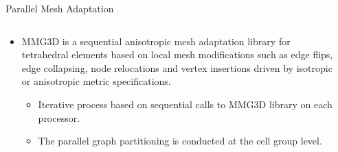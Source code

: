 \documentclass[10pt]{beamer}
\begin{document}
\begin{frame}{Parallel Mesh Adaptation}
\begin{columns}
\begin{column}{0.55\textwidth}
\begin{itemize}
\justifying
\item[\ding{252}] {\color{um6pcolor}MMG3D} is a sequential anisotropic mesh adaptation library for tetrahedral elements
based on local mesh modifications such as edge flips, edge collapsing, node relocations and vertex
insertions driven by isotropic or anisotropic metric specifications.
\begin{itemize}
\justifying
\item[\ding{212}] Iterative process based on sequential calls to MMG3D library on each processor.
\item[\ding{212}] The parallel graph partitioning is conducted at the cell group level.
\end{itemize}
\end{itemize}
\end{column}
\begin{column}{0.45\textwidth}
\end{column}
\end{columns}



\end{frame}
\end{document}
